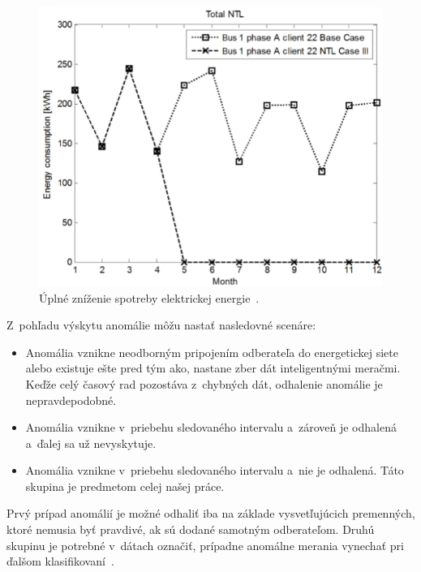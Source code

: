 \documentclass[a4paper,twoside,slovak,12pt,appendix]{article}
\begin{document}
\begin{figure}[htbp]
\begin{minipage}{0.45\textwidth}
\begin{center}
      \includegraphics[scale=0.33]{decrease-total.png}
			\caption[Úplné zníženie spotreby elektrickej energie.]{Úplné zníženie spotreby elektrickej energie~\cite{Trevizan2015}.}
			\label{fig:decrease-total}
    \end{center}
  \end{minipage}\hfill

\end{figure}

\noindent
Z~pohľadu výskytu anomálie môžu nastať nasledovné scenáre:
\begin{itemize}
  \item Anomália vznikne neodborným pripojením odberateľa do energetickej siete alebo existuje ešte pred tým ako, nastane zber dát inteligentnými meračmi.
        Keďže celý časový rad pozostáva z~chybných dát, odhalenie anomálie je nepravdepodobné.
  \item Anomália vznikne v~priebehu sledovaného intervalu a~zároveň je odhalená a~ďalej sa už nevyskytuje.
  \item Anomália vznikne v~priebehu sledovaného intervalu a~nie je odhalená. Táto skupina je predmetom celej našej práce.
\end{itemize}
Prvý prípad anomálií je možné odhaliť iba na základe vysvetľujúcich premenných,
ktoré nemusia byť pravdivé, ak sú dodané samotným odberateľom. Druhú skupinu je
potrebné v~dátach označiť, prípadne anomálne merania vynechať pri ďalšom
klasifikovaní~\cite{Spiric2015}.

\end{document}
